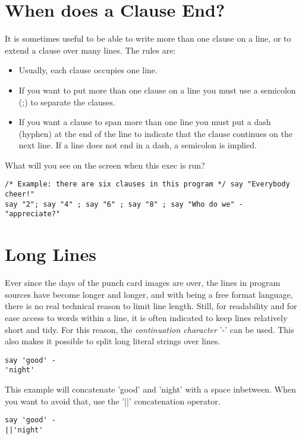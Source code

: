 {\section{When does a Clause End?}
It is sometimes useful to be able to write more than one clause on a
line, or to extend a clause over many lines. The rules are:
\begin{itemize}
\item Usually, each clause occupies one line.
\item If you want to put more than one clause on a line you must use a semicolon (;) to separate the clauses.
\item If you want a clause to span more than one line you must put a
  dash (hyphen) at the end of the line to indicate that the clause
  continues on the next line. If a line does not end in a dash, a
  semicolon is implied.
\end{itemize}
What will you see on the screen when this exec is run?
\begin{lstlisting}[label=rah,caption=RAH Exec]
/* Example: there are six clauses in this program */ say "Everybody cheer!"
say "2"; say "4" ; say "6" ; say "8" ; say "Who do we" -
"appreciate?"
\end{lstlisting}
\section{Long Lines}
Ever since the days of the punch card images are over, the lines in program
sources have become longer and longer, and with \nr{} being a free
format language, there is no real technical reason to limit line
length. Still, for readability and for ease access to words within a
line, it is often indicated to keep lines relatively short and
tidy. For this reason, the \emph{continuation character} '-' can be
used. This also makes it possible to split long literal strings over
lines.
\begin{lstlisting}[label=longline,caption=Long lines]
say 'good' - 
'night'
\end{lstlisting}
This example will concatenate 'good' and 'night' with a space
inbetween. When you want to avoid that, use the '||' concatenation
operator.
\begin{lstlisting}[label=longlineconcat,caption=Long lines with string
  concatenation without space]
say 'good' - 
||'night'
\end{lstlisting}

}
